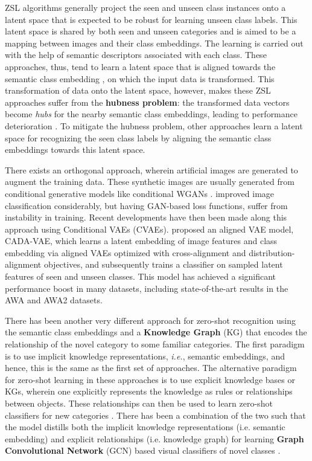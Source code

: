 \documentclass{article}
\begin{document}
ZSL algorithms generally project the seen and unseen class instances onto a latent space that is expected to be robust for learning unseen class labels. 
This latent space is shared by both seen and unseen categories and is aimed to be a mapping between images and their class embeddings. 
The learning is carried out with the help of semantic descriptors associated with each class. 
These approaches, thus, tend to learn a latent space that is aligned towards the semantic class embedding \citep{sabr10, sabr12, sabr14, sabr17, sabr19, sabr23}, on which the input data is transformed. 
This transformation of data onto the latent space, however, makes these ZSL approaches suffer from the \textbf{hubness problem}: 
the transformed data vectors become \textit{hubs} for the nearby semantic class embeddings, leading to performance deterioration \citep{sabr18, sabr16, sabr9}. 
To mitigate the hubness problem, 
other approaches \citep{sabr29, sabr5, sabr31, sabr18, akanksha} learn a latent space for recognizing the seen class labels by aligning the semantic class embeddings towards this latent space. 

There exists an orthogonal approach, wherein artificial images \citep{cada23} are generated to augment the training data. 
These synthetic images are usually generated from conditional generative models like conditional WGANs \citep{sabr25}. 
\citet{sabr25} improved image classification considerably, but having GAN-based loss functions, suffer from instability in training. 
Recent developments have then been made along this approach using Conditional VAEs (CVAEs). 
\citet{edgar} proposed an aligned VAE model, CADA-VAE, which 
learns a latent embedding of image features and class embedding via aligned VAEs optimized with cross-alignment and distribution-alignment objectives, 
and subsequently trains a classifier on sampled latent features of seen and unseen classes. 
This model has achieved a significant performance boost in many datasets, including state-of-the-art results in the AWA and AWA2 datasets.

There has been another very different approach for zero-shot recognition using the semantic class embeddings and a \textbf{Knowledge Graph}  (KG)
that encodes the relationship of the novel category to some familiar categories. 
The ﬁrst paradigm is to use implicit knowledge representations, \textit{i.e.}, semantic embeddings, and hence, this is the same as the first set of approaches.
The alternative paradigm for zero-shot learning in these approaches is to use explicit knowledge bases or KGs, 
wherein one explicitly represents the knowledge as rules or relationships between objects. 
These relationships can then be used to learn zero-shot classifiers for new categories \citep{gcn33}. 
There has been a combination of the two such that the model distills both the implicit knowledge representations (i.e. semantic embedding) and 
explicit relationships (i.e. knowledge graph) for learning \textbf{Graph Convolutional Network} (GCN) based visual classiﬁers of novel classes \citep{abhinav}.
\end{document}
